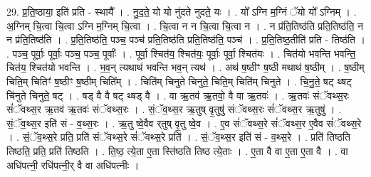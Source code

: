 \documentclass[17pt]{extarticle}
\begin{document}
29. प्र॒ति॒ष्ठाया॒ इति॑ प्रति - स्थायै᳚ । . नु॒द॒ते॒ यो यो नु॑दते नुदते॒ यः । . यो᳚ ऽग्नि म॒ग्निं ॅयो यो᳚ ऽग्निम् । . अ॒ग्निम् चि॒त्वा चि॒त्वा ऽग्नि म॒ग्निम् चि॒त्वा । . चि॒त्वा न न चि॒त्वा चि॒त्वा न । . न प्र॑ति॒तिष्ठ॑ति प्रति॒तिष्ठ॑ति॒ न न प्र॑ति॒तिष्ठ॑ति । . प्र॒ति॒तिष्ठ॑ति॒ पञ्च॒ पञ्च॑ प्रति॒तिष्ठ॑ति प्रति॒तिष्ठ॑ति॒ पञ्च॑ । . प्र॒ति॒तिष्ठ॒तीति॑ प्रति - तिष्ठ॑ति । . पञ्च॒ पूर्वाः॒ पूर्वाः॒ पञ्च॒ पञ्च॒ पूर्वाः᳚ । . पूर्वा॒ श्चित॑य॒ श्चित॑यः॒ पूर्वाः॒ पूर्वा॒ श्चित॑यः । . चित॑यो भवन्ति भवन्ति॒ चित॑य॒ श्चित॑यो भवन्ति । . भ॒व॒न् त्यथाथ॑ भवन्ति भव॒न् त्यथ॑ । . अथ॑ ष॒ष्ठीꣳ ष॒ष्ठी मथाथ॑ ष॒ष्ठीम् । . ष॒ष्ठीम् चिति॒म् चितिꣳ॑ ष॒ष्ठीꣳ ष॒ष्ठीम् चिति᳚म् । . चिति॑म् चिनुते चिनुते॒ चिति॒म् चिति॑म् चिनुते । . चि॒नु॒ते॒ षट् थ्षट् चि॑नुते चिनुते॒ षट् । . षड् वै वै षट् थ्षड् वै । . वा ऋ॒तव॑ ऋ॒तवो॒ वै वा ऋ॒तवः॑ । . ऋ॒तवः॑ संॅवथ्स॒रः सं॑ॅवथ्स॒र ऋ॒तव॑ ऋ॒तवः॑ संॅवथ्स॒रः । . सं॒ॅव॒थ्स॒र ऋ॒तुष् वृ॒तुषु॑ संॅवथ्स॒रः सं॑ॅवथ्स॒र ऋ॒तुषु॑ । . सं॒ॅव॒थ्स॒र इति॑ सं - व॒थ्स॒रः । . ऋ॒तु ष्वे॒वैव र्‌तुष् वृ॒तु ष्वे॒व । . ए॒व सं॑ॅवथ्स॒रे सं॑ॅवथ्स॒र ए॒वैव सं॑ॅवथ्स॒रे । . सं॒ॅव॒थ्स॒रे प्रति॒ प्रति॑ संॅवथ्स॒रे सं॑ॅवथ्स॒रे प्रति॑ । . सं॒ॅव॒थ्स॒र इति॑ सं - व॒थ्स॒रे । . प्रति॑ तिष्ठति तिष्ठति॒ प्रति॒ प्रति॑ तिष्ठति । . ति॒ष्ठ॒ त्ये॒ता ए॒ता स्ति॑ष्ठति तिष्ठ त्ये॒ताः । . ए॒ता वै वा ए॒ता ए॒ता वै । . वा अधि॑पत्नी॒ रधि॑पत्नी॒र् वै वा अधि॑पत्नीः । \newline
\end{document}
